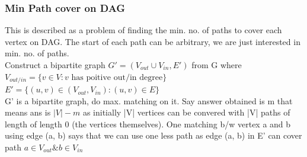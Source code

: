 \documentclass[8pt, a4paper, oneside, twocolumn]{extarticle}
\begin{document}
\subsubsection{Min Path cover on DAG}
This is described as a problem of finding the min. no. of paths to cover each vertex on DAG. The start of each path can be arbitrary, we are just interested in min. no. of paths.
\\Construct a bipartite graph $G' = (V_{out} \cup V_{in}, E')$ from G where $V_{out/in} = \{v \in V: v \text{ has poitive out/in degree}\}$
\\$E' = \{(u, v) \in (V_{out}, V_{in}) : (u, v) \in E\}$
\\G' is a bipartite graph, do max. matching on it. Say answer obtained is m that means ans is $|V| - m$ as initially |V| vertices can be convered with |V| paths of length of length 0 (the vertices themselves). One matching b/w vertex a and b using edge (a, b) says that we can use one less path as edge (a, b) in E' can cover path $a \in V_{out} \& b\in V_{in}$
\end{document}
